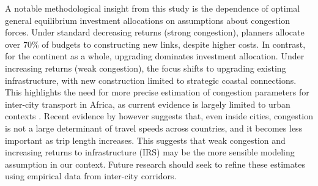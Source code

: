 \documentclass[a4paper]{article}
\begin{document}
A notable methodological insight from this study is the dependence of optimal general equilibrium investment allocations on assumptions about congestion forces. Under standard decreasing returns (strong congestion), planners allocate over 70\% of budgets to constructing new links, despite higher costs. In contrast, for the continent as a whole, upgrading dominates investment allocation. Under increasing returns (weak congestion), the focus shifts to upgrading existing infrastructure, with new construction limited to strategic coastal connections. This highlights the need for more precise estimation of congestion parameters for inter-city transport in Africa, as current evidence is largely limited to urban contexts \citep{graff2024spatial, fajgelbaum2020optimal}. Recent evidence by \citet{NBERw31642} however suggests that, even inside cities, congestion is not a large determinant of travel speeds across countries, and it becomes less important as trip length increases. This suggests that weak congestion and increasing returns to infrastructure (IRS) may be the more sensible modeling assumption in our context. Future research should seek to refine these estimates using empirical data from inter-city corridors.  \newline


 

\end{document}
